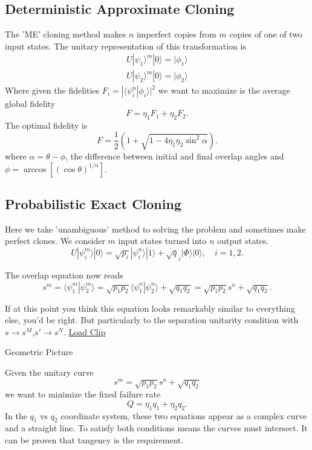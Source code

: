 \documentclass{beamer}
\newcommand{\ke}[1]{|#1\rangle}
\newcommand{\bk}[2]{\langle #1|#2\rangle}
\begin{document}
\subsection{Deterministic Approximate Cloning}
\begin{frame}
The 'ME' cloning method makes $n$ imperfect copies from $m$ copies of one of two input states.
The unitary representation of this transformation is
\begin{eqnarray*}
U \ke{\psi_1}^m\ke 0  = \ke {\phi_1}\\
U \ke{\psi_2}^m\ke 0  = \ke {\phi_2}
\end{eqnarray*}
Where given the fidelities $F_i = |\bk{\psi_i^n}{\phi_i}|^2$ we want to maximize is the average global fidelity
\[F = \eta_1 F_1 +\eta_2 F_2.\]
The optimal fidelity is
\[F = \frac{1}{2}( 1 + \sqrt{1-  4 \eta_1 \eta_2 \sin^2 \alpha}).\]
where $\alpha = \theta -\phi$, the difference between initial and final overlap angles and $\phi = \arccos \left[ (\cos \theta)^{1/n}\right]$.
\end{frame}
\subsection{Probabilistic Exact Cloning}
\begin{frame}
Here we take 'unambiguous' method to solving the problem and sometimes make perfect clones.  We consider $m$ input states turned into $n$ output states.
\begin{equation*}
U|\psi^m_i\rangle|0\rangle= \sqrt{p_i}|\psi^n_i\rangle|1\rangle +\sqrt q_i |\Phi\rangle |0\rangle,\quad i=1,2. \label{Ui}
\end{equation*}

The overlap equation now reads 
\[s^m = \bk {\psi_1^m}{\psi_2^m} = \sqrt{p_1 p_2} \bk {\psi_1^n}{\psi_2^n}  + \sqrt{q_1 q_2} =\sqrt{p_1 p_2} s^n+ \sqrt{q_1 q_2}.\]

If at this point you think this equation looks remarkably similar to everything else, you'd be right. But particularly to the separation
 unitarity condition with $s \rightarrow s^M$,$s' \rightarrow s^N$.
\href{file:///C:/Users/Vadim/Documents/work/Final exam/manipulateUnitaryCondition.swf}{Load Clip}
\end{frame}


\begin{frame}{Geometric Picture}


Given the unitary curve
\[s^m=\sqrt{p_1 p_2} s^n+ \sqrt{q_1 q_2}\]
 we want to minimize the fixed failure rate 
\[Q = \eta_1 q_1 + \eta_2 q_2.\] 
In the $q_1$ vs $q_2$ coordinate system, these two equations appear as a complex curve and a straight line.  To satisfy both conditions means the curves must intersect.
It can be proven that tangency is the requirement. 
\end{frame}
\end{document}
